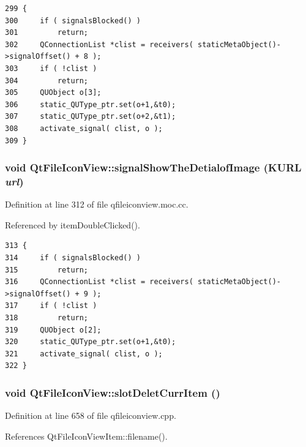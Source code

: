 \footnotesize\begin{verbatim}299 {
300     if ( signalsBlocked() )
301         return;
302     QConnectionList *clist = receivers( staticMetaObject()->signalOffset() + 8 );
303     if ( !clist )
304         return;
305     QUObject o[3];
306     static_QUType_ptr.set(o+1,&t0);
307     static_QUType_ptr.set(o+2,&t1);
308     activate_signal( clist, o );
309 }
\end{verbatim}\normalsize 
{}
\subsubsection{\setlength{\rightskip}{0pt plus 5cm}void Qt\-File\-Icon\-View::signal\-Show\-The\-Detialof\-Image (KURL {\em url})\hspace{0.3cm}{\tt  [signal]}}\label{classQtFileIconView_QtFileIconViewl9}




Definition at line 312 of file qfileiconview.moc.cc.

Referenced by item\-Double\-Clicked().



\footnotesize\begin{verbatim}313 {
314     if ( signalsBlocked() )
315         return;
316     QConnectionList *clist = receivers( staticMetaObject()->signalOffset() + 9 );
317     if ( !clist )
318         return;
319     QUObject o[2];
320     static_QUType_ptr.set(o+1,&t0);
321     activate_signal( clist, o );
322 }
\end{verbatim}\normalsize 
{}
\subsubsection{\setlength{\rightskip}{0pt plus 5cm}void Qt\-File\-Icon\-View::slot\-Delet\-Curr\-Item ()\hspace{0.3cm}{\tt  [slot]}}\label{classQtFileIconView_QtFileIconViewi4}




Definition at line 658 of file qfileiconview.cpp.

References Qt\-File\-Icon\-View\-Item::filename().

